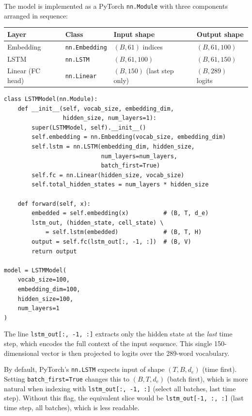 \documentclass[12pt,a4paper]{article}
\begin{document}
The model is implemented as a PyTorch \texttt{nn.Module} with three components
arranged in sequence:

\begin{center}
\begin{tabular}{llll}
\toprule
\textbf{Layer}          & \textbf{Class}      & \textbf{Input shape}        & \textbf{Output shape} \\
\midrule
Embedding               & \texttt{nn.Embedding}  & $(B, 61)$ indices           & $(B, 61, 100)$ \\
LSTM                    & \texttt{nn.LSTM}       & $(B, 61, 100)$              & $(B, 61, 150)$ \\
Linear (FC head)        & \texttt{nn.Linear}     & $(B, 150)$ (last step only) & $(B, 289)$ logits \\
\bottomrule
\end{tabular}
\end{center}

\begin{example}[title=LSTMModel Class (PyTorch)]
\begin{verbatim}
class LSTMModel(nn.Module):
    def __init__(self, vocab_size, embedding_dim,
                 hidden_size, num_layers=1):
        super(LSTMModel, self).__init__()
        self.embedding = nn.Embedding(vocab_size, embedding_dim)
        self.lstm = nn.LSTM(embedding_dim, hidden_size,
                            num_layers=num_layers,
                            batch_first=True)
        self.fc = nn.Linear(hidden_size, vocab_size)
        self.total_hidden_states = num_layers * hidden_size

    def forward(self, x):
        embedded = self.embedding(x)          # (B, T, d_e)
        lstm_out, (hidden_state, cell_state) \
            = self.lstm(embedded)             # (B, T, H)
        output = self.fc(lstm_out[:, -1, :])  # (B, V)
        return output

model = LSTMModel(
    vocab_size=100,
    embedding_dim=100,
    hidden_size=100,
    num_layers=1
)
\end{verbatim}
The line \texttt{lstm\_out[:, -1, :]} extracts only the hidden state at the
\emph{last} time step, which encodes the full context of the input sequence.
This single 150-dimensional vector is then projected to logits over the
289-word vocabulary.
\end{example}

\begin{keyinsight}[title=Why \texttt{batch\_first=True}?]
  By default, PyTorch's \texttt{nn.LSTM} expects input of shape
  $(T, B, d_e)$ (time first).  Setting \texttt{batch\_first=True} changes
  this to $(B, T, d_e)$ (batch first), which is more natural when indexing
  with \texttt{lstm\_out[:, -1, :]} (select all batches, last time step).
  Without this flag, the equivalent slice would be
  \texttt{lstm\_out[-1, :, :]} (last time step, all batches), which is less
  readable.
\end{keyinsight}
\end{document}
